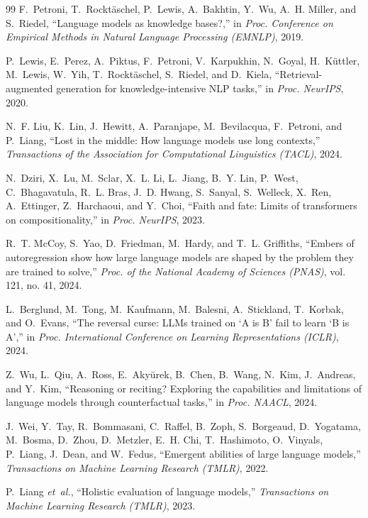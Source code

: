 \documentclass[conference]{IEEEtran}
\begin{document}
\begin{thebibliography}{99}
F.~Petroni, T.~Rockt\"aschel, P.~Lewis, A.~Bakhtin, Y.~Wu, A.~H. Miller, and S.~Riedel, ``Language models as knowledge bases?,'' in \emph{Proc. Conference on Empirical Methods in Natural Language Processing (EMNLP)}, 2019.

P.~Lewis, E.~Perez, A.~Piktus, F.~Petroni, V.~Karpukhin, N.~Goyal, H.~K\"uttler, M.~Lewis, W.~Yih, T.~Rockt\"aschel, S.~Riedel, and D.~Kiela, ``Retrieval-augmented generation for knowledge-intensive NLP tasks,'' in \emph{Proc. NeurIPS}, 2020.

N.~F. Liu, K.~Lin, J.~Hewitt, A.~Paranjape, M.~Bevilacqua, F.~Petroni, and P.~Liang, ``Lost in the middle: How language models use long contexts,'' \emph{Transactions of the Association for Computational Linguistics (TACL)}, 2024.

N.~Dziri, X.~Lu, M.~Sclar, X.~L. Li, L.~Jiang, B.~Y. Lin, P.~West, C.~Bhagavatula, R.~L. Bras, J.~D. Hwang, S.~Sanyal, S.~Welleck, X.~Ren, A.~Ettinger, Z.~Harchaoui, and Y.~Choi, ``Faith and fate: Limits of transformers on compositionality,'' in \emph{Proc. NeurIPS}, 2023.

R.~T. McCoy, S.~Yao, D.~Friedman, M.~Hardy, and T.~L. Griffiths, ``Embers of autoregression show how large language models are shaped by the problem they are trained to solve,'' \emph{Proc. of the National Academy of Sciences (PNAS)}, vol. 121, no. 41, 2024.

L.~Berglund, M.~Tong, M.~Kaufmann, M.~Balesni, A.~Stickland, T.~Korbak, and O.~Evans, ``The reversal curse: LLMs trained on `A is B' fail to learn `B is A','' in \emph{Proc. International Conference on Learning Representations (ICLR)}, 2024.

Z.~Wu, L.~Qiu, A.~Ross, E.~Aky\"urek, B.~Chen, B.~Wang, N.~Kim, J.~Andreas, and Y.~Kim, ``Reasoning or reciting? Exploring the capabilities and limitations of language models through counterfactual tasks,'' in \emph{Proc. NAACL}, 2024.

J.~Wei, Y.~Tay, R.~Bommasani, C.~Raffel, B.~Zoph, S.~Borgeaud, D.~Yogatama, M.~Bosma, D.~Zhou, D.~Metzler, E.~H. Chi, T.~Hashimoto, O.~Vinyals, P.~Liang, J.~Dean, and W.~Fedus, ``Emergent abilities of large language models,'' \emph{Transactions on Machine Learning Research (TMLR)}, 2022.

P.~Liang \emph{et~al.}, ``Holistic evaluation of language models,'' \emph{Transactions on Machine Learning Research (TMLR)}, 2023.


\end{thebibliography}
\end{document}
